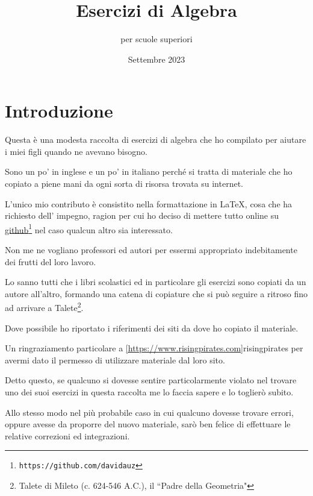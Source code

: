 \documentclass[a4paper,14pt]{extarticle}
\title{Esercizi di Algebra}
\author{per scuole superiori}
\date{Settembre 2023}
\begin{document}
\maketitle
\tableofcontents
\newpage

\section{Introduzione}

Questa è una modesta raccolta di esercizi di algebra che ho compilato per aiutare i
miei figli quando ne avevano bisogno.

Sono un po' in inglese e un po' in italiano perché
si tratta di materiale che ho copiato a piene mani da ogni sorta di risorsa trovata su internet.

L'unico mio contributo è consistito nella formattazione in  \LaTeX, cosa che ha richiesto 
dell' impegno, ragion per cui ho deciso di mettere tutto online su \href{https://github.com/davidauz}{github}\footnote{\texttt{https://github.com/davidauz}}
nel caso qualcun altro sia interessato.

Non me ne vogliano professori ed autori per essermi appropriato indebitamente dei frutti del loro lavoro.

Lo sanno tutti che i libri scolastici ed in particolare gli esercizi sono copiati da un autore all'altro,
formando una catena di copiature che si può seguire a ritroso fino ad arrivare a 
Talete\footnote{Talete di Mileto (c. 624-546 A.C.), il ``Padre della Geometria"}.

Dove possibile ho riportato i riferimenti dei siti da dove ho copiato il materiale.

Un ringraziamento particolare a \ref{https://www.risingpirates.com}{risingpirates} per avermi dato il permesso di
utilizzare materiale dal loro sito.

Detto questo, se qualcuno si dovesse sentire particolarmente violato nel trovare uno dei suoi esercizi in 
questa raccolta me lo faccia sapere e lo toglierò subito.

Allo stesso modo nel più probabile caso in cui qualcuno dovesse trovare errori, oppure avesse da proporre del 
nuovo materiale, sarò ben felice di effettuare le relative correzioni ed integrazioni.


% 
% 
% 
% 
% 
% 
% 
% 

% 
% 

\end{document}
